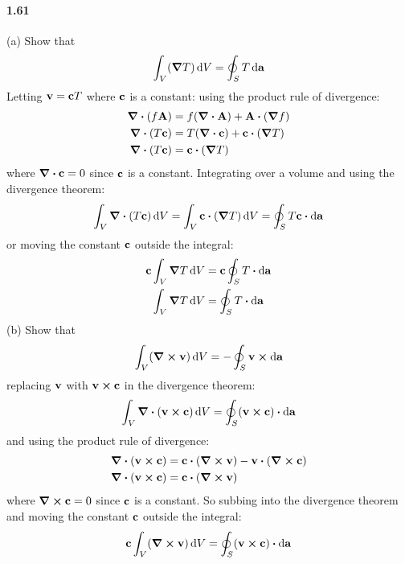 \documentclass[../main.tex]{subfiles}
\begin{document}
\paragraph{1.61}
(a) Show that
\begin{align*}
    \int_V (\grad T) \dd{V} = \oint_S T \dd{\vb{a}} 
\end{align*}
Letting $\vb{v} = \vb{c} T$ where $\vb{c}$ is a constant: using the product rule of divergence:
\begin{align*}
    \div(f\vb{A}) &= f (\div \vb{A}) + \vb{A} \vdot (\grad{f}) \\
    \div(T \vb{c}) &= T (\div \vb{c}) + \vb{c} \vdot (\grad{T}) \\
    \div(T \vb{c}) &= \vb{c} \vdot (\grad{T})
\end{align*}
where $\div \vb{c} = 0$ since $\vb{c}$ is a constant. Integrating over a volume and using the 
divergence theorem:
\begin{align*}
    \int_V \div(T \vb{c}) \dd{V} = \int_V \vb{c} \vdot (\grad{T}) \dd{V}
        = \oint_S T \vb{c} \vdot \dd{\vb{a}}
\end{align*}
or moving the constant $\vb{c}$ outside the integral:
\begin{align*}
    \vb{c} \int_V \grad{T} \dd{V} &= \vb{c} \oint_S T  \vdot \dd{\vb{a}} \\
    \int_V \grad{T} \dd{V} &= \oint_S T  \vdot \dd{\vb{a}}
\end{align*}
(b) Show that
\begin{align*}
    \int_V (\curl \vb{v}) \dd{V} = - \oint_S \vb{v} \cp \dd{\vb{a}}
\end{align*}
replacing $\vb{v}$ with $\vb{v} \cp \vb{c}$ in the divergence theorem:
\begin{align}
    \int_V \div(\vb{v} \cp \vb{c}) \dd{V} = \oint_S (\vb{v} \cp \vb{c}) \vdot \dd{\vb{a}}
\end{align}
and using the product rule of divergence:
\begin{align*}
    \div(\vb{v} \cp \vb{c}) &= \vb{c} \vdot (\curl \vb{v}) - \vb{v} \vdot (\curl \vb{c}) \\
    \div(\vb{v} \cp \vb{c}) &= \vb{c} \vdot (\curl \vb{v})
\end{align*}
where $\curl \vb{c} = 0$ since $\vb{c}$ is a constant. So subbing into the divergence theorem and
moving the constant $\vb{c}$ outside the integral:
\begin{align*}
    \vb{c} \int_V (\curl \vb{v}) \dd{V} &= \oint_S (\vb{v} \cp \vb{c}) \vdot \dd{\vb{a}} \\
\end{align*}
\end{document}
